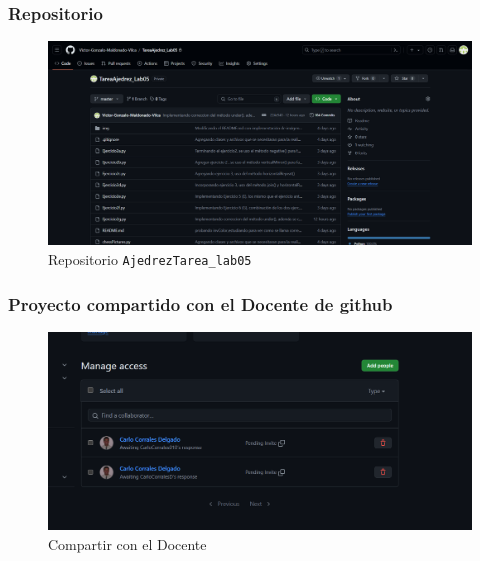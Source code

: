 \documentclass{article}
\begin{document}

	\subsubsection{Repositorio}
  \begin{figure}[H]
    \centering
    \includegraphics[width=1\textwidth, keepaspectratio]{img/Repositorio.png}
    \caption{Repositorio \protect\texttt{AjedrezTarea\_lab05}}
  \end{figure}
  \newpage
  

	\subsubsection{Proyecto compartido con el Docente de github}
  \begin{figure}[H]
    \centering
    \includegraphics[width=1\textwidth, keepaspectratio]{img/Compartir.png}
    \caption{Compartir con el Docente}
  \end{figure}
  
\end{document}
